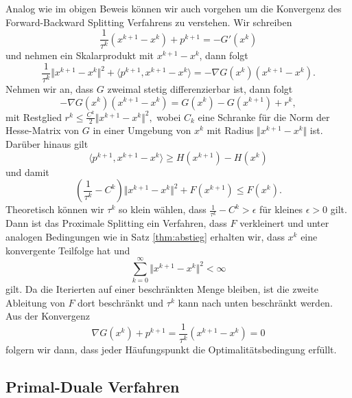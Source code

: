 Analog wie im obigen Beweis können wir auch vorgehen um die Konvergenz des Forward-Backward Splitting Verfahrens zu verstehen. Wir schreiben 
$$ \frac{1}{\tau^k} (x^{k+1} - x^k) + p^{k+1} = - G'(x^k) $$
und nehmen ein Skalarprodukt mit $x^{k+1} - x^k$, dann folgt
$$  \frac{1}{\tau^k} \Vert x^{k+1} - x^k \Vert^2 + \langle p^{k+1}, x^{k+1} - x^k \rangle = - \nabla G (x^k) (x^{k+1} - x^k). $$
Nehmen wir an, dass $G$ zweimal stetig differenzierbar ist, dann folgt 
$$ - \nabla G (x^k) (x^{k+1} - x^k) = G(x^k) - G(x^{k+1}) + r^k, $$
mit Restglied $r^k \leq \frac{C^k}2 \Vert x^{k+1} - x^k \Vert^2, $
wobei $C_k$ eine Schranke f\"ur die Norm der Hesse-Matrix von $G$ in einer Umgebung von $x^k$ mit Radius $\Vert x^{k+1} - x^k \Vert$ ist. Dar\"uber hinaus gilt
$$  \langle p^{k+1}, x^{k+1} - x^k \rangle \geq H(x^{k+1}) - H(x^k) $$ 
und damit 
$$ (\frac{1}{\tau^k}-C^k) \Vert x^{k+1} - x^k \Vert^2 + F(x^{k+1}) \leq F(x^k). $$
Theoretisch k\"onnen wir $\tau^k$ so klein w\"ahlen, dass $ \frac{1}{\tau^k}-C^k > \epsilon$ f\"ur kleines $\epsilon > 0$ gilt. 
Dann ist das Proximale Splitting ein Verfahren, dass $F$ verkleinert und unter analogen Bedingungen wie in Satz \ref{thm:abstieg} erhalten wir, dass $x^k$ eine konvergente Teilfolge hat und 
$$ \sum_{k=0}^\infty  \Vert x^{k+1} - x^k \Vert^2 < \infty $$
gilt. Da die Iterierten auf einer beschr\"ankten Menge bleiben, ist die zweite Ableitung von $F$ dort beschr\"ankt und $\tau^k $ kann nach unten beschr\"ankt werden. Aus der Konvergenz
$$ \nabla G(x^k) + p^{k+1} = \frac{1}{\tau^k}( x^{k+1} - x^k) = 0 $$
folgern wir dann, dass jeder H\"aufungspunkt die Optimalit\"atsbedingung erf\"ullt. 

\subsection{Primal-Duale Verfahren}

